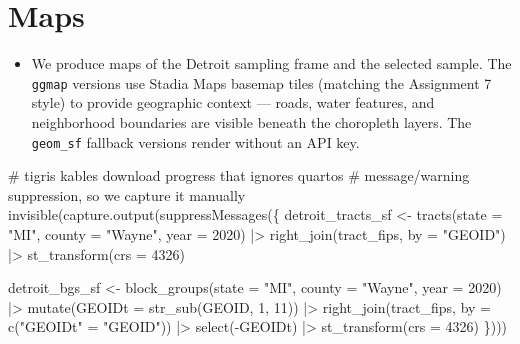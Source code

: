 \documentclass[
  11pt,
]{article}
\newenvironment{Shaded}{\begin{snugshade}}{\end{snugshade}}
\newcommand{\AttributeTok}[1]{\textcolor[rgb]{0.40,0.45,0.13}{#1}}
\newcommand{\CommentTok}[1]{\textcolor[rgb]{0.37,0.37,0.37}{#1}}
\newcommand{\DecValTok}[1]{\textcolor[rgb]{0.68,0.00,0.00}{#1}}
\newcommand{\FunctionTok}[1]{\textcolor[rgb]{0.28,0.35,0.67}{#1}}
\newcommand{\NormalTok}[1]{\textcolor[rgb]{0.00,0.23,0.31}{#1}}
\newcommand{\OtherTok}[1]{\textcolor[rgb]{0.00,0.23,0.31}{#1}}
\newcommand{\SpecialCharTok}[1]{\textcolor[rgb]{0.37,0.37,0.37}{#1}}
\newcommand{\StringTok}[1]{\textcolor[rgb]{0.13,0.47,0.30}{#1}}
\providecommand{\tightlist}{%
  \setlength{\itemsep}{0pt}\setlength{\parskip}{0pt}}\usepackage{longtable,booktabs,array}
\begin{document}
\section{Maps}\label{sec-maps}

\begin{itemize}
\tightlist
\item
  We produce maps of the Detroit sampling frame and the selected sample.
  The \texttt{ggmap} versions use Stadia Maps basemap tiles (matching
  the Assignment 7 style) to provide geographic context --- roads, water
  features, and neighborhood boundaries are visible beneath the
  choropleth layers. The \texttt{geom\_sf} fallback versions render
  without an API key.
\end{itemize}

\begin{Shaded}
\begin{Highlighting}[]
\CommentTok{\# tigris kables download progress that ignores quarto\textquotesingle{}s}
\CommentTok{\# message/warning suppression, so we capture it manually}
\FunctionTok{invisible}\NormalTok{(}\FunctionTok{capture.output}\NormalTok{(}\FunctionTok{suppressMessages}\NormalTok{(\{}
\NormalTok{  detroit\_tracts\_sf }\OtherTok{\textless{}{-}} \FunctionTok{tracts}\NormalTok{(}\AttributeTok{state =} \StringTok{"MI"}\NormalTok{, }\AttributeTok{county =} \StringTok{"Wayne"}\NormalTok{, }\AttributeTok{year =} \DecValTok{2020}\NormalTok{) }\SpecialCharTok{|\textgreater{}}
    \FunctionTok{right\_join}\NormalTok{(tract\_fips, }\AttributeTok{by =} \StringTok{"GEOID"}\NormalTok{) }\SpecialCharTok{|\textgreater{}} \FunctionTok{st\_transform}\NormalTok{(}\AttributeTok{crs =} \DecValTok{4326}\NormalTok{)}

\NormalTok{  detroit\_bgs\_sf }\OtherTok{\textless{}{-}} \FunctionTok{block\_groups}\NormalTok{(}\AttributeTok{state =} \StringTok{"MI"}\NormalTok{, }\AttributeTok{county =} \StringTok{"Wayne"}\NormalTok{, }\AttributeTok{year =} \DecValTok{2020}\NormalTok{) }\SpecialCharTok{|\textgreater{}}
    \FunctionTok{mutate}\NormalTok{(}\AttributeTok{GEOIDt =} \FunctionTok{str\_sub}\NormalTok{(GEOID, }\DecValTok{1}\NormalTok{, }\DecValTok{11}\NormalTok{)) }\SpecialCharTok{|\textgreater{}}
    \FunctionTok{right\_join}\NormalTok{(tract\_fips, }\AttributeTok{by =} \FunctionTok{c}\NormalTok{(}\StringTok{"GEOIDt"} \OtherTok{=} \StringTok{"GEOID"}\NormalTok{)) }\SpecialCharTok{|\textgreater{}}
    \FunctionTok{select}\NormalTok{(}\SpecialCharTok{{-}}\NormalTok{GEOIDt) }\SpecialCharTok{|\textgreater{}} \FunctionTok{st\_transform}\NormalTok{(}\AttributeTok{crs =} \DecValTok{4326}\NormalTok{)}
\NormalTok{\})))}
\end{Highlighting}
\end{Shaded}
\end{document}
